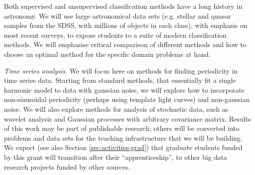 Both supervised and unsupervised classification methods have a long
history in astronomy. We will use large astronomical data sets (e.g. 
stellar and quasar samples from the SDSS, with millions of objects in
each class), with emphasis on most recent surveys, to expose students
to a suite of modern classification methods. We will emphasise critical
comparison of different methods and how to choose an optimal method
for the specific domain problems at hand.
\item {\em Time series analysis.} 
We will focus here on methods for finding periodicity in time series 
data. Starting from standard methods, that essentially fit a single 
harmonic model to data with gaussian noise, we will explore how
to incorporate non-sinusoidal periodicity (perhaps using template 
light curves) and non-gaussian noise. We will also explore methods 
for analysis of stochastic data, such as wavelet analysis and Gaussian
processes with arbitrary covariance matrix.
\eits
%
Results of this work may be part of publishable research; others will
be converted into problems and data sets for the teaching
infrastructure that we will be building. We expect (see also Section
\ref{sec:activities-grad}) that graduate students funded by this grant
will transition after their ``apprenticeship'', to other big data
research projects funded by other sources. 

